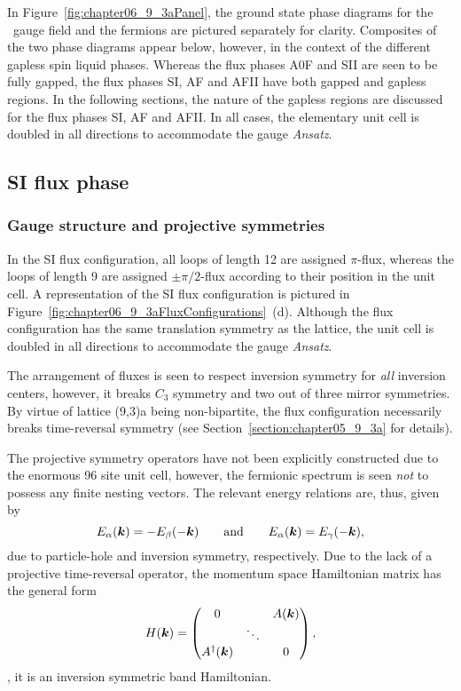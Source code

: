 In Figure~\ref{fig:chapter06_9_3aPanel}, the ground state phase diagrams for the \ZZ~gauge field and the fermions are pictured separately for clarity.
Composites of the two phase diagrams appear below, however, in the context of the different gapless spin liquid phases.
Whereas the flux phases A0F and SII are seen to be fully gapped, the flux phases SI, AF and AFII have both gapped and gapless regions.
In the following sections, the nature of the gapless regions are discussed for the flux phases SI, AF and AFII.
In all cases, the elementary unit cell is doubled in all directions to accommodate the gauge \textit{Ansatz}.


%
%
\subsection{SI flux phase}
\label{section:chapter06_SIPhase}
%
%
\subsubsection{Gauge structure and projective symmetries}
%
%
In the SI flux configuration, all loops of length 12 are assigned $\pi$-flux, whereas the loops of length 9 are assigned $\pm \pi/2$-flux according to their position in the unit cell.
A representation of the SI flux configuration is pictured in Figure~\ref{fig:chapter06_9_3aFluxConfigurations}~(d).
Although the flux configuration has the same translation symmetry as the lattice, the unit cell is doubled in all directions to accommodate the gauge \textit{Ansatz}.

The arrangement of fluxes is seen to respect inversion symmetry for \textit{all} inversion centers, however, it breaks $C_3$ symmetry and two out of three mirror symmetries.
By virtue of lattice (9,3)a being non-bipartite, the flux configuration necessarily breaks time-reversal symmetry (see Section~\ref{section:chapter05_9_3a} for details).

The projective symmetry operators have not been explicitly constructed due to the enormous 96 site unit cell, however, the fermionic spectrum is seen \textit{not} to possess any finite nesting vectors.
The relevant energy relations are, thus, given by
%
\begin{equation}
	E_{\alpha}(\bm{k}) = -E_{\beta}(-\bm{k}) \qquad {\rm and} \qquad E_{\alpha}(\bm{k}) = E_{\gamma}(-\bm{k}),
\end{equation}
%
due to particle-hole and inversion symmetry, respectively.
Due to the lack of a projective time-reversal operator, the momentum space Hamiltonian matrix has the general form
%
\begin{equation}
	H(\bm{k}) = 
		\begin{pmatrix}
			0			&		 & A(\bm{k}) \\
						& \ddots & 		  \\
			A^{\dagger}(\bm{k})	&		 & 0
		\end{pmatrix},
\end{equation}
%
\ie, it is an inversion symmetric band Hamiltonian.


